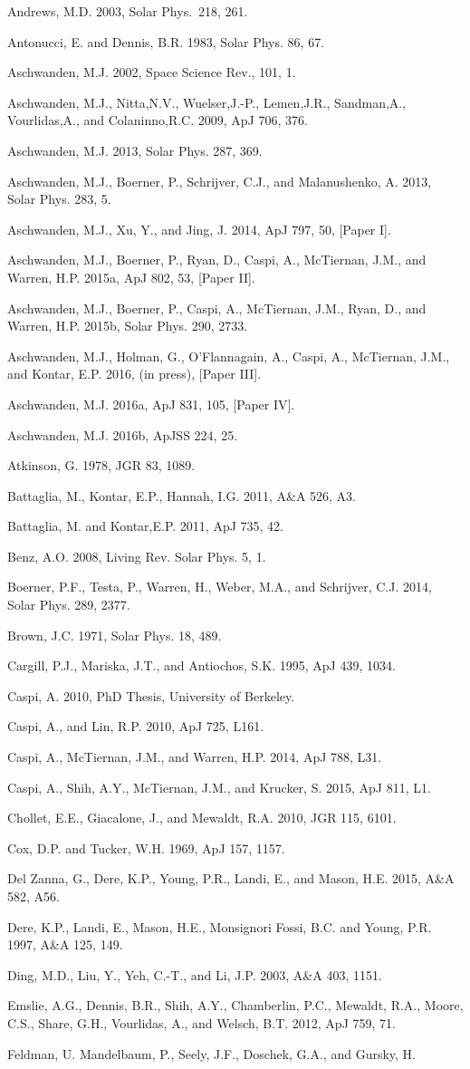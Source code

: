 \documentclass[10pt,preprint]{aastex}  %
\begin{document}
\begin{references} %

\def\ref#1{\par\noindent{} {#1}}

\ref{Andrews, M.D. 2003, Solar Phys.~218, 261.}
\ref{Antonucci, E. and Dennis, B.R. 1983, Solar Phys. 86, 67.}
\ref{Aschwanden, M.J. 2002, Space Science Rev., 101, 1.}
\ref{Aschwanden, M.J., Nitta,N.V., Wuelser,J.-P., Lemen,J.R., 
	Sandman,A., Vourlidas,A., and Colaninno,R.C. 2009, ApJ 706, 376.}
\ref{Aschwanden, M.J. 2013, Solar Phys. 287, 369.}
\ref{Aschwanden, M.J., Boerner, P., Schrijver, C.J., 
	and Malanushenko, A. 2013, Solar Phys. 283, 5.}
\ref{Aschwanden, M.J., Xu, Y., and Jing, J. 2014, ApJ 797, 50, [Paper I].}
\ref{Aschwanden, M.J., Boerner, P., Ryan, D., Caspi, A., McTiernan, J.M.,
        and Warren, H.P. 2015a, ApJ 802, 53, [Paper II].}
\ref{Aschwanden, M.J., Boerner, P., Caspi, A., McTiernan, J.M., 
	Ryan, D., and Warren, H.P. 2015b, Solar Phys. 290, 2733.}
\ref{Aschwanden, M.J., Holman, G., O'Flannagain, A., Caspi, A., 
	McTiernan, J.M., and Kontar, E.P. 2016, (in press), [Paper III].}
\ref{Aschwanden, M.J. 2016a, ApJ 831, 105, [Paper IV].}
\ref{Aschwanden, M.J. 2016b, ApJSS 224, 25.}
\ref{Atkinson, G. 1978, JGR 83, 1089.}
\ref{Battaglia, M., Kontar, E.P., Hannah, I.G. 2011, A\&A 526, A3.}
\ref{Battaglia, M. and Kontar,E.P. 2011, ApJ 735, 42.}
\ref{Benz, A.O. 2008, Living Rev. Solar Phys. 5, 1.}
\ref{Boerner, P.F., Testa, P., Warren, H., Weber, M.A., and Schrijver, C.J.
 	2014, Solar Phys. 289, 2377.}
\ref{Brown, J.C. 1971, Solar Phys. 18, 489.}
\ref{Cargill, P.J., Mariska, J.T., and Antiochos, S.K. 1995, ApJ 439, 1034.}
\ref{Caspi, A. 2010, PhD Thesis, University of Berkeley.}
\ref{Caspi, A., and Lin, R.P. 2010, ApJ 725, L161.}
\ref{Caspi, A., McTiernan, J.M., and Warren, H.P. 2014, ApJ 788, L31.}
\ref{Caspi, A., Shih, A.Y., McTiernan, J.M., and Krucker, S. 2015, ApJ 811, L1.}
\ref{Chollet, E.E., Giacalone, J., and Mewaldt, R.A. 2010, JGR 115, 6101.}
\ref{Cox, D.P. and Tucker, W.H. 1969, ApJ 157, 1157.}
\ref{Del Zanna, G., Dere, K.P., Young, P.R., Landi, E., and Mason, H.E.
	2015, A\&A 582, A56.}
\ref{Dere, K.P., Landi, E., Mason, H.E., Monsignori Fossi, B.C. and
	Young, P.R. 1997, A\&A 125, 149.}
\ref{Ding, M.D., Liu, Y., Yeh, C.-T., and Li, J.P. 2003, A\&A 403, 1151.}
\ref{Emslie, A.G., Dennis, B.R., Shih, A.Y., Chamberlin, P.C., Mewaldt, R.A.,
        Moore, C.S., Share, G.H., Vourlidas, A., and Welsch, B.T. 2012,
        ApJ 759, 71.}
\ref{Feldman, U. Mandelbaum, P., Seely, J.F., Doschek, G.A., and Gursky, H.
}
\end{references}
\end{document}
